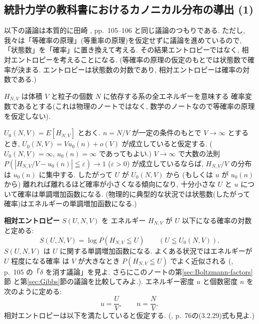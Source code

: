 \documentclass[12pt,twoside]{jarticle}
\newcommand\eps{\varepsilon}
\theoremstyle{jplain}
\theoremstyle{jplain}
\theoremstyle{jplain}
\numberwithin{theorem}{section}
\numberwithin{equation}{section}
\numberwithin{figure}{section}
\numberwithin{table}{section}
\newcommand\secref[1]{第\ref{#1}節}
\begin{document}
\subsection{統計力学の教科書におけるカノニカル分布の導出 (1)}
\label{sec:canonical-distribution-in-physics}

以下の議論は本質的に田崎 \cite{Tasaki}, pp.~105--106 と同じ議論のつもりである.
ただし, 我々は「等確率の原理」(等重率の原理)を仮定せずに議論を進めているので,
「状態数」を「確率」に置き換えて考える.
その結果エントロピーではなく, 相対エントロピーを考えることになる.
(等確率の原理の仮定のもとでは状態数で確率が決まる.
エントロピーは状態数の対数であり, 相対エントロピーは確率の対数である.)

$H_{N,V}$ は体積 $V$ と粒子の個数 $N$ に依存する系の全エネルギーを意味する
確率変数であるとする(これは物理のノートではなく,
数学のノートなので等確率の原理を仮定しない).

$U_0(N,V)=E[H_{N,V}]$ とおく.
$n=N/V$ が一定の条件のもとで $V\to\infty$ とするとき,
$U_0(N,V)=V u_0(n)+o(V)$ が成立していると仮定する.
($U_0(N,V)=\infty$, $u_0(n)=\infty$ であってもよい.)
$V\to\infty$ で大数の法則 $P(|H_{N,V}/V-u_0(n)|\leqq\eps)\to 1$ ($\eps>0$)
が成立しているならば, $H_{N,V}/V$ の分布は $u_0(n)$ に集中する.
したがって $U$ が $U_0(N,V)$ から
(もしくは $u$ が $u_0(n)$ から)
離れれば離れるほど確率が小さくなる傾向になり,
十分小さな $U$ と $u$ について確率は単調増加函数になる.
(物理的に典型的な状況では状態数(したがって確率)はエネルギーの単調増加函数になる.)

{\bfseries 相対エントロピー} $S(U,N,V)$ を
エネルギー $H_{N,V}$ が $U$ 以下になる確率の対数と定める:
\[
S(U,N,V) = \log P(H_{N,V}\leqq U)
\qquad (U\leqq U_0(N,V)).
\]
$S(U,N,V)$ は $U$ に関する単調増加函数になる.
よくある状況ではエネルギーが $U$ 程度になる確率
は $V$ が大きなとき $P(H_{N,V}\leqq U)$ でよく近似される
(\cite{Tasaki}, p.~105 の「$\delta$ を消す議論」を見よ.
さらにこのノートの\secref{sec:Boltzmann-factors}
と\secref{sec:Gibbs}の議論を比較してみよ.).
エネルギー密度 $u$ と個数密度 $n$ を次のように定める:
\[
u=\frac{U}{V}, \qquad n=\frac{N}{V}.
\]
相対エントロピーは以下を満たしていると仮定する.
(\cite{Tasaki}, p.~76の(3.2.29)式も見よ.)
\end{document}
